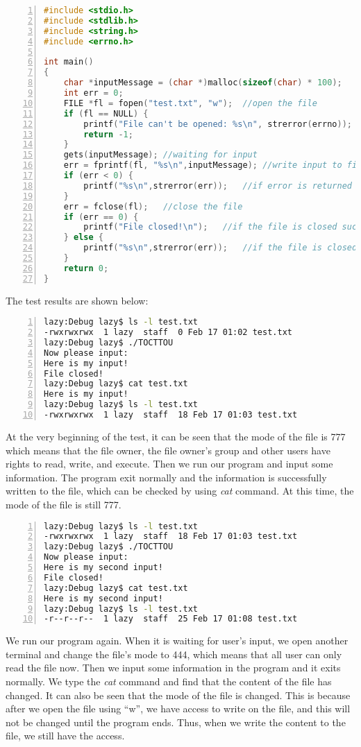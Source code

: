 \begin{enumerate}
\begin{lstlisting}[language=C,numbers=left,numberstyle=\tiny,columns=fullflexible,basicstyle=\footnotesize\ttfamily, breaklines=true, breakautoindent=true, breakindent=4em]
#include <stdio.h> 
#include <stdlib.h>
#include <string.h>
#include <errno.h>

int main()
{
    char *inputMessage = (char *)malloc(sizeof(char) * 100);    //init and allocate memory for user input
    int err = 0;
    FILE *fl = fopen("test.txt", "w");  //open the file
    if (fl == NULL) {
        printf("File can't be opened: %s\n", strerror(errno));  //if file is not opened
        return -1;
    }
    gets(inputMessage); //waiting for input
    err = fprintf(fl, "%s\n",inputMessage); //write input to file
    if (err < 0) {
        printf("%s\n",strerror(err));   //if error is returned in writing
    }
    err = fclose(fl);   //close the file
    if (err == 0) {
        printf("File closed!\n");   //if the file is closed successfully
    } else {
        printf("%s\n",strerror(err));   //if the file is closed with error
    }
    return 0;
}
\end{lstlisting}
The test results are shown below:
\begin{lstlisting}[language=sh,numbers=left,numberstyle=\tiny,columns=fullflexible,basicstyle=\footnotesize\ttfamily, breaklines=true, breakautoindent=true, breakindent=4em]
lazy:Debug lazy$ ls -l test.txt 
-rwxrwxrwx  1 lazy  staff  0 Feb 17 01:02 test.txt
lazy:Debug lazy$ ./TOCTTOU 
Now please input:
Here is my input!
File closed!
lazy:Debug lazy$ cat test.txt 
Here is my input!
lazy:Debug lazy$ ls -l test.txt 
-rwxrwxrwx  1 lazy  staff  18 Feb 17 01:03 test.txt
\end{lstlisting}
At the very beginning of the test, it can be seen that the mode of the file is 777 which means that the file owner, the file owner's group and other users have rights to read, write, and execute. Then we run our program and input some information. The program exit normally and the information is successfully written to the file, which can be checked by using \textit{cat} command. At this time, the mode of the file is still 777.
\begin{lstlisting}[language=sh,numbers=left,numberstyle=\tiny,columns=fullflexible,basicstyle=\footnotesize\ttfamily, breaklines=true, breakautoindent=true, breakindent=4em]
lazy:Debug lazy$ ls -l test.txt 
-rwxrwxrwx  1 lazy  staff  18 Feb 17 01:03 test.txt
lazy:Debug lazy$ ./TOCTTOU 
Now please input:
Here is my second input!
File closed!
lazy:Debug lazy$ cat test.txt 
Here is my second input!
lazy:Debug lazy$ ls -l test.txt 
-r--r--r--  1 lazy  staff  25 Feb 17 01:08 test.txt
\end{lstlisting}
We run our program again. When it is waiting for user's input, we open another terminal and change the file's mode to 444, which means that all user can only read the file now. Then we input some information in the program and it exits normally. We type the \textit{cat} command and find that the content of the file has changed. It can also be seen that the mode of the file is changed. This is because after we open the file using ``w'', we have access to write on the file, and this will not be changed until the program ends. Thus, when we write the content to the file, we still have the access.

\end{enumerate}
